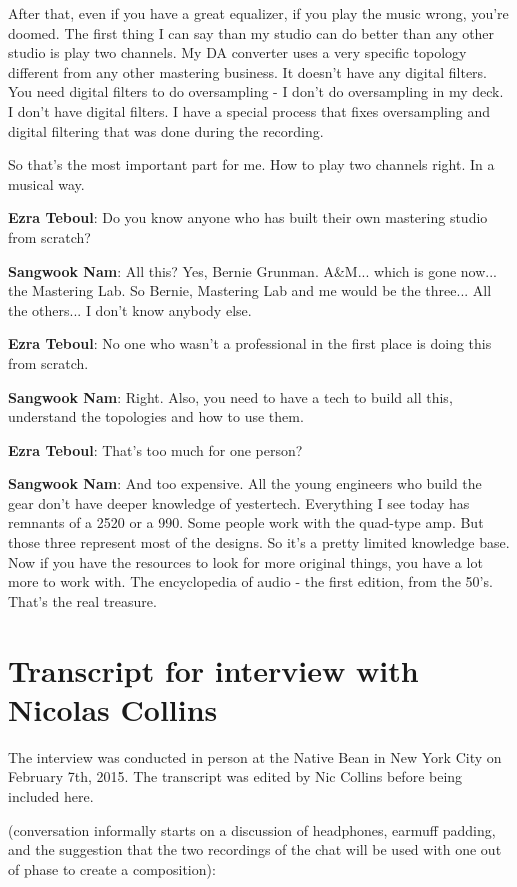 After that, even if you have a great equalizer, if you play the music wrong, you're doomed. The first thing I can say than my studio can do better than any other studio is play two channels. My DA converter uses a very specific topology different from any other mastering business. It doesn't have any digital filters. You need digital filters to do oversampling - I don't do oversampling in my deck. I don't have digital filters. I have a special process that fixes oversampling and digital filtering that was done during the recording.

So that's the most important part for me. How to play two channels right. In a musical way.

\textbf{Ezra Teboul}: Do you know anyone who has built their own mastering studio from scratch?

\textbf{Sangwook Nam}: All this? Yes, Bernie Grunman. A\&M... which is gone now... the Mastering Lab. So Bernie, Mastering Lab and me would be the three... All the others... I don't know anybody else.

\textbf{Ezra Teboul}: No one who wasn't a professional in the first place is doing this from scratch.

\textbf{Sangwook Nam}: Right. Also, you need to have a tech to build all this, understand the topologies and how to use them.

\textbf{Ezra Teboul}: That's too much for one person?

\textbf{Sangwook Nam}: And too expensive. All the young engineers who build the gear don't have deeper knowledge of yestertech. Everything I see today has remnants of a 2520 or a 990. Some people work with the quad-type amp. But those three represent most of the designs. So it's a pretty limited knowledge base. Now if you have the resources to look for more original things, you have a lot more to work with. The encyclopedia of audio - the first edition, from the 50's. That's the real treasure.

\newpage

\clearpage 
\section{Transcript for interview with Nicolas Collins}

The interview was conducted in person at the Native Bean in New York City on February 7th, 2015. The transcript was edited by Nic Collins before being included here.  
					
(conversation informally starts on a discussion of headphones, earmuff padding, and the suggestion that the two recordings of the chat will be used with one out of phase to create a composition):
					
